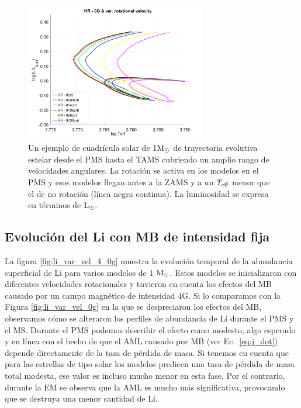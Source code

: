 \begin{figure}
    \centering
    \includegraphics[width=0.7\textwidth]{img/paper1/hr_var_vel_0_0g_z1.pdf}
	\caption{Un ejemplo de cuadrícula solar de 1$\mathrm{M}_\odot$ de trayectoria evolutiva estelar desde el PMS hasta el TAMS cubriendo un amplio rango de velocidades angulares. La rotación se activa en los modelos en el PMS y esos modelos llegan antes a la ZAMS y a un $T_{\mathrm{eff}}$ menor que el de no rotación (línea negra continua). La luminosidad se expresa en términos de $\mathrm{L}_\odot$.}
	\label{fig:hr_var_vel_0g}
\end{figure}

\subsection{Evolución del Li con MB de intensidad fija}
La figura \ref{fig:li_var_vel_4_0g} muestra la evolución temporal de la abundancia superficial de Li para varios modelos de 1 $\mathrm{M}_\odot$. Estos modelos se inicializaron con diferentes velocidades rotacionales y tuvieron en cuenta los efectos del MB causado por un campo magnético de intensidad 4G. Si lo comparamos con la Figura \ref{fig:li_var_vel_0g} en la que se despreciaron los efectos del MB, observamos cómo se alteraron los perfiles de abundancia de Li durante el PMS y el MS. Durante el PMS podemos describir el efecto como modesto, algo esperado y en línea con el hecho de que el AML causado por MB (ver Ec.~\ref{eq:j_dot}) depende directamente de la tasa de pérdida de masa. Si tenemos en cuenta que para las estrellas de tipo solar los modelos predicen una tasa de pérdida de masa total modesta, ese valor es incluso mucho menor en esta fase. Por el contrario, durante la EM se observa que la AML es mucho más significativa, provocando que se destruya una menor cantidad de Li.\par

